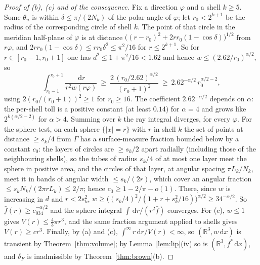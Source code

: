 \documentclass[11pt]{amsart}
\newcommand{\R}{\mathbb{R}}
\newcommand{\dd}{\,\mathrm{d}}
\newcommand{\abs}[1]{\lvert #1\rvert}
\newcommand{\fbar}{\bar f}
\theoremstyle{plain}
\theoremstyle{definition}
\theoremstyle{remark}
\begin{document}
\begin{proof}[Proof of (b), (c) and of the consequence]
Fix a direction $\varphi$ and a shell $k\ge5$. Some $\theta_n$ is within
$\delta\le\pi/(2N_k)$ of the polar angle of $\varphi$; let $r_0<2^{k+1}$ be the
radius of the corresponding circle of shell $k$. The point of that circle in
the meridian half-plane of $\varphi$ is at distance
$\bigl((r-r_0)^2+2rr_0(1-\cos\delta)\bigr)^{1/2}$ from $r\varphi$, and
$2rr_0(1-\cos\delta)\le rr_0\delta^2\le\pi^2/16$ for $r\le2^{k+1}$. So for
$r\in[r_0-1,r_0+1]$ one has $d^2\le1+\pi^2/16<1.62$ and
hence $w\le(2.62/r_0)^{\alpha/2}$, so
\begin{equation}\label{eq:raybound}
\int_{r_0-1}^{r_0+1}\frac{\dd r}{r^2w(r\varphi)}\ \ge\
\frac{2\,(r_0/2.62)^{\alpha/2}}{(r_0+1)^2}\ \ge\ 2.62^{-\alpha/2}\,r_0^{\alpha/2-2},
\end{equation}
using $2(r_0/(r_0+1))^2\ge1$ for $r_0\ge16$. The coefficient $2.62^{-\alpha/2}$
depends on $\alpha$: the per-shell toll is a positive constant (at least $0.14$)
for $\alpha=4$ and grows like $2^{k(\alpha/2-2)}$ for
$\alpha>4$. Summing over $k$ the ray integral diverges, for every $\varphi$. For
the sphere test, on each sphere $\{\abs x=r\}$ with $r$ in shell $k$ the set of
points at distance $\ge s_k/4$ from $\Gamma$ has a surface-measure fraction
bounded below by a constant $c_0$: the layers of circles are $\ge s_k/2$ apart
radially (including those of the neighbouring shells), so the tubes of radius
$s_k/4$ of at most one layer meet the sphere in positive area, and the circles of
that layer, at angular spacing $\pi L_k/N_k$, meet it in bands of angular width
$\le s_k/(2r)$, which cover an angular fraction $\le s_kN_k/(2\pi rL_k)\le2/\pi$;
hence $c_0\ge1-2/\pi-o(1)$. There, since $w$ is increasing in $d$ and $r<2s_k^2$,
$w\ge\bigl((s_k/4)^2/(1+r+s_k^2/16)\bigr)^{\alpha/2}\ge34^{-\alpha/2}$.
So $\fbar(r)\ge c_034^{-\alpha/2}$ and the sphere integral $\int\dd r/(r^2\fbar)$
converges. For (c), $w\le1$ gives $V(r)\le\frac43\pi r^3$, and the same
fraction argument applied to shells gives $V(r)\ge cr^3$. Finally, by (a) and
(c), $\int^\infty r\dd r/V(r)<\infty$, so $(\R^3,w\dd x)$ is transient by
Theorem~\ref{thm:volume}; by Lemma~\ref{lem:lip}(iv) so is
$(\R^3,f^*\dd x)$, and $\delta_F$ is inadmissible by
Theorem~\ref{thm:brown}(b).
\end{proof}
\end{document}
